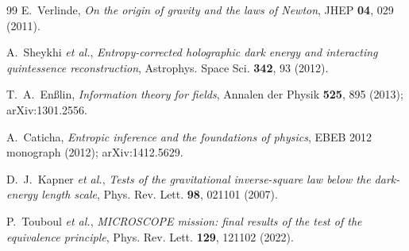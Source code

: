 \documentclass[11pt,reqno]{amsart}
\theoremstyle{plain}
\theoremstyle{definition}
\theoremstyle{remark}
\begin{document}
\begin{thebibliography}{99}
E.~Verlinde,
\emph{On the origin of gravity and the laws of Newton},
JHEP \textbf{04}, 029 (2011).

A.~Sheykhi \emph{et al.},
\emph{Entropy-corrected holographic dark energy and interacting quintessence reconstruction},
Astrophys. Space Sci. \textbf{342}, 93 (2012).

T.~A.~En{\ss}lin,
\emph{Information theory for fields},
Annalen der Physik \textbf{525}, 895 (2013); arXiv:1301.2556.

A.~Caticha,
\emph{Entropic inference and the foundations of physics},
EBEB 2012 monograph (2012); arXiv:1412.5629.

D.~J.~Kapner \emph{et al.},
\emph{Tests of the gravitational inverse-square law below the dark-energy length scale},
Phys. Rev. Lett. \textbf{98}, 021101 (2007).

P.~Touboul \emph{et al.},
\emph{MICROSCOPE mission: final results of the test of the equivalence principle},
Phys. Rev. Lett. \textbf{129}, 121102 (2022).

\end{thebibliography}
\end{document}
